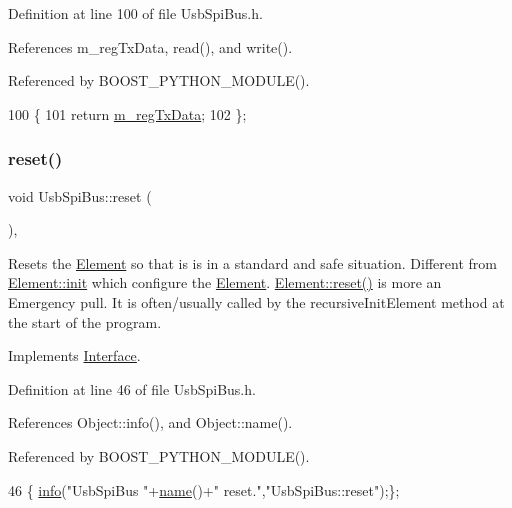Definition at line 100 of file Usb\+Spi\+Bus.\+h.



References m\+\_\+reg\+Tx\+Data, read(), and write().



Referenced by B\+O\+O\+S\+T\+\_\+\+P\+Y\+T\+H\+O\+N\+\_\+\+M\+O\+D\+U\+L\+E().


\begin{DoxyCode}
100                         \{
101     \textcolor{keywordflow}{return} \hyperlink{classUsbSpiBus_ae4b9ec4d035b9a507735b28dba04556c}{m\_regTxData};
102   \};
\end{DoxyCode}
\mbox{\label{classUsbSpiBus_aa795a27f7429f0c0285056964659d433}} 
\subsubsection{\texorpdfstring{reset()}{reset()}}
{\footnotesize\ttfamily void Usb\+Spi\+Bus\+::reset (\begin{DoxyParamCaption}{ }\end{DoxyParamCaption})\hspace{0.3cm}{\ttfamily [inline]}, {\ttfamily [virtual]}}

Resets the \hyperlink{classElement}{Element} so that is is in a standard and safe situation. Different from \hyperlink{classElement_af42754b5cabc198869222725218d695c}{Element\+::init} which configure the \hyperlink{classElement}{Element}. \hyperlink{classElement_a69efffa22f06909d768149715565cb56}{Element\+::reset()} is more an Emergency pull. It is often/usually called by the recursive\+Init\+Element method at the start of the program. 

Implements \hyperlink{classInterface_a4d44329cea9981a9e0392eaaf99efadd}{Interface}.



Definition at line 46 of file Usb\+Spi\+Bus.\+h.



References Object\+::info(), and Object\+::name().



Referenced by B\+O\+O\+S\+T\+\_\+\+P\+Y\+T\+H\+O\+N\+\_\+\+M\+O\+D\+U\+L\+E().


\begin{DoxyCode}
46 \{ \hyperlink{classObject_a644fd329ea4cb85f54fa6846484b84a8}{info}(\textcolor{stringliteral}{"UsbSpiBus "}+\hyperlink{classObject_a300f4c05dd468c7bb8b3c968868443c1}{name}()+\textcolor{stringliteral}{" reset."},\textcolor{stringliteral}{"UsbSpiBus::reset"});\};
\end{DoxyCode}
\mbox{\label{classUsbSpiBus_ab24f6e85697305b26997b8dec3f18254}} 
